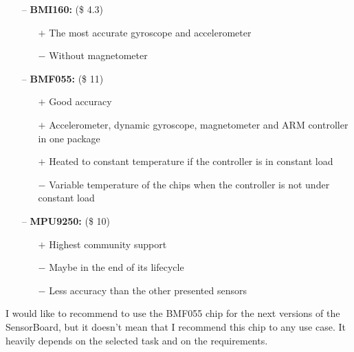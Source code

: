 \begin{itemize}
	\item[--] \textbf{BMI160:} (\$ 4.3) \cite{bosch:BMI160}
	\begin{itemize}
		\item[$+$] The most accurate gyroscope and accelerometer
		\item[$-$] Without magnetometer
	\end{itemize}
	\item[--] \textbf{BMF055:} (\$ 11) \cite{bosch:BMF055}
	\begin{itemize}
		\item[$+$] Good accuracy
		\item[$+$] Accelerometer, dynamic gyroscope, magnetometer and \ac{ARM} controller in one package
		\item[$+$] Heated to constant temperature if the controller is in constant load
		\item[$-$] Variable temperature of the chips when the controller is not under constant load
	\end{itemize}
	\item[--] \textbf{MPU9250:} (\$ 10) \cite{invensense:MPU9250}
	\begin{itemize}
		\item[$+$] Highest community support
		\item[$-$] Maybe in the end of its lifecycle
		\item[$-$] Less accuracy than the other presented sensors
	\end{itemize}
\end{itemize}

I would like to recommend to use the BMF055 chip for the next versions of the SensorBoard, but it doesn't mean that I recommend this chip to any use case. It heavily depends on the selected task and on the requirements.
